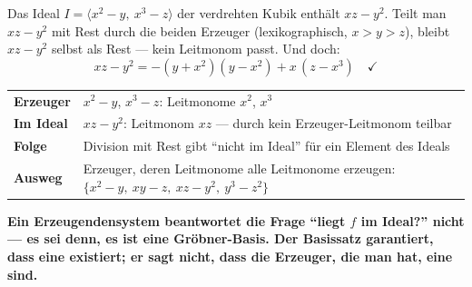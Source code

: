 \begin{warnung}
Das Ideal $I = \langle x^{2} - y,\ x^{3} - z\rangle$ der verdrehten Kubik enthält $xz - y^{2}$. Teilt man $xz - y^{2}$ mit Rest durch die beiden Erzeuger (lexikographisch, $x > y > z$), bleibt $xz - y^{2}$ selbst als Rest --- kein Leitmonom passt. Und doch:
\[ xz - y^{2} = -(y + x^{2})(y - x^{2}) + x\,(z - x^{3}) \quad\checkmark \]

\begin{center}
{\small
\renewcommand{\arraystretch}{1.5}
\begin{tabular}{@{}P{3.0cm}P{5.8cm}@{}}
\toprule
\textbf{Erzeuger} & $x^{2} - y$, $x^{3} - z$: Leitmonome $x^{2}$, $x^{3}$\\
\textbf{Im Ideal} & $xz - y^{2}$: Leitmonom $xz$ --- durch kein Erzeuger-Leitmonom teilbar\\
\textbf{Folge} & Division mit Rest gibt \enquote{nicht im Ideal} für ein Element des Ideals\\
\textbf{Ausweg} & Erzeuger, deren Leitmonome alle Leitmonome erzeugen: $\{x^{2} - y,\ xy - z,\ xz - y^{2},\ y^{3} - z^{2}\}$\\
\bottomrule
\end{tabular}}
\end{center}

\begin{center}
\begin{minipage}{0.9\textwidth}
\textbf{Ein Erzeugendensystem beantwortet die Frage \enquote{liegt $f$ im Ideal?} nicht --- es sei denn, es ist eine Gröbner-Basis. Der Basissatz garantiert, dass eine existiert; er sagt nicht, dass die Erzeuger, die man hat, eine sind.}
\end{minipage}
\end{center}

\begin{center}
\begin{minipage}{0.88\textwidth}
\end{minipage}
\end{center}
\end{warnung}

